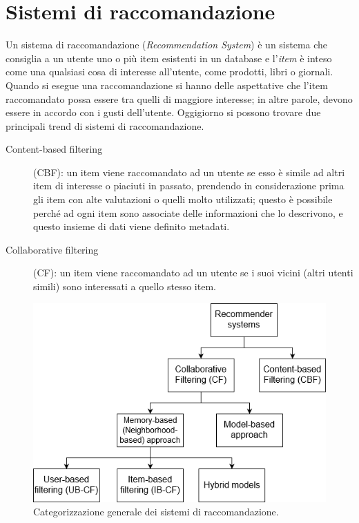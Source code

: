 \section{Sistemi di raccomandazione}
Un sistema di raccomandazione (\textit{Recommendation System}) è un sistema che consiglia a un utente uno o più item esistenti 
in un database e l'\textit{item} è inteso come una qualsiasi cosa di interesse all'utente, come prodotti, libri o giornali. Quando si esegue 
una raccomandazione si hanno delle aspettative che l'item raccomandato possa essere tra quelli di maggiore interesse; in altre parole, 
devono essere in accordo con i gusti dell'utente.\hfill\break
Oggigiorno si possono trovare due principali trend di sistemi di raccomandazione.
\begin{description}
    \item[Content-based filtering](CBF): un item viene raccomandato ad un utente se esso è simile ad altri item di interesse o piaciuti 
    in passato, prendendo in considerazione prima gli item con alte valutazioni o quelli molto utilizzati; questo è possibile perché ad 
    ogni item sono associate delle informazioni che lo descrivono, e questo insieme di dati viene definito metadati.
    \item[Collaborative filtering](CF): un item viene raccomandato ad un utente se i suoi vicini (altri utenti simili) sono 
    interessati a quello stesso item.
\end{description}
%
\begin{figure}[ht!]
    \centering
    \includegraphics[scale=0.5]{images/recommender_systems.png}
    \caption{Categorizzazione generale dei sistemi di raccomandazione.}
    \label{fig:recommender_systems}
\end{figure}
